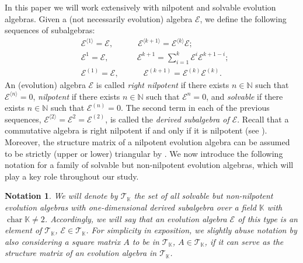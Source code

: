 \documentclass[12pt,reqno]{amsart}
\newtheorem{notation}[theorem]{Notation}
\theoremstyle{definition}
\theoremstyle{remark}
\numberwithin{equation}{section}
\begin{document}
In this paper we will work extensively with nilpotent and solvable evolution algebras. Given a (not necessarily evolution) algebra $\mathcal{E}$, we define the following sequences of subalgebras:
\begin{align*}
		&\mathcal{E}^{\langle1\rangle}=\mathcal{E},\qquad \quad  \mathcal{E}^{\langle k+1\rangle}=\mathcal{E}^{\langle k\rangle}\mathcal{E};	\\	
		&\mathcal{E}^1=\mathcal{E},\qquad  \quad  \ \ \mathcal{E}^{k+1}=\sum_{i=1}^k\mathcal{E}^i\mathcal{E}^{k+1-i};	\\
		&\mathcal{E}^{(1)}=\mathcal{E},\qquad \quad  \mathcal{E}^{(k+1)}=\mathcal{\mathcal{E}}^{(k)}\mathcal{E}^{(k)}.
	\end{align*}
An (evolution) algebra $\mathcal{E}$ is called \textit{right nilpotent} if there exists $n\in\mathbb{N}$ such that
 $\mathcal{E}^{\langle n\rangle}=0$, \textit{nilpotent} if there exists $n\in\mathbb{N}$ such that $\mathcal{E}^{n}=0$,
  and \textit{solvable} if there exists $n\in\mathbb{N}$ such that $\mathcal{E}^{(n)}=0$. The second term in each of the
  previous sequences, $\mathcal{E}^{\langle2\rangle}=\mathcal{E}^{2}=\mathcal{E}^{(2)}$, is called the \textit{derived
  	 subalgebra of $\mathcal{E}$}. Recall that a commutative algebra is right nilpotent if and only if it is nilpotent (see \cite[Chapter 4, Proposition 1]{ZSSS_82}). Moreover, the structure matrix of a nilpotent evolution algebra can be assumed to be strictly (upper or lower) triangular by \cite[Theorem~2.7]{CLOR_14}. 
We now introduce the following notation for a family  of solvable but non-nilpotent evolution algebras, which will play a key role throughout our study. %

\begin{notation}
We will denote by $\mathcal{T}_{\mathbb{K}}$ the set of all solvable but non-nilpotent evolution algebras with one-dimensional derived subalgebra over a field $\mathbb{K}$ with $\operatorname{char}\mathbb{K}\neq2$. Accordingly, we will say that an evolution algebra $\mathcal{E}$ of this type is an element of $\mathcal{T}_{\mathbb{K}}$, $\mathcal{E}\in\mathcal{T}_\mathbb{K}$. For simplicity in exposition, we slightly abuse notation by also considering a square matrix $A$ to be in $\mathcal{T}_{\mathbb{K}}$, $A\in\mathcal{T}_\mathbb{K}$, if it can serve as the structure matrix of an evolution algebra in $\mathcal{T}_\mathbb{K}$.
\end{notation}
\end{document}

